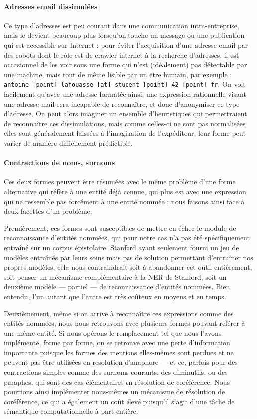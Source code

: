 \documentclass[11pt]{article}
\begin{document}
\paragraph{Adresses email dissimulées}

Ce type d'adresses est peu courant dans une communication intra-entreprise,
mais le devient beaucoup plus lorsqu'on touche un message ou une publication qui
est accessible sur Internet : pour éviter l'acquisition d'une adresse email
par des robots dont le rôle est de crawler internet à la recherche d'adresses,
il est occasionnel de les voir sous une forme qui n'est (idéalement) pas
détectable par une machine, mais tout de même lisible par un être humain, 
par exemple : \texttt{antoine [point] lafouasse [at] student [point] 42 [point]
fr}. On voit facilement qu'avec une adresse formatée ainsi, une expression
rationnelle visant une adresse mail sera incapable de reconnaître, et donc
d'anonymiser ce type d'adresse. On peut alors imaginer un ensemble
d'heuristiques qui permettraient de reconnaître ces dissimulations, mais comme
celles-ci ne sont pas normalisées elles sont généralement laissées à
l'imagination de l'expéditeur, leur forme peut varier de manière difficilement
prédictible.

\paragraph{Contractions de noms, surnoms}

Ces deux formes peuvent être résumées avec le même problème d'une forme
alternative qui réfère à une entité déjà connue, qui plus est avec une
expression qui ne ressemble pas forcément à une entité nommée ; nous faisons
ainsi face à deux facettes d'un problème.

Premièrement, ces formes sont susceptibles de mettre en échec le module de
reconnaissance d'entités nommées, qui pour notre cas n'a pas été spécifiquement
entraîné sur un corpus épistolaire. Stanford ayant seulement fourni un jeu de
modèles entraînés par leurs soins mais pas de solution permettant d'entraîner
nos propres modèles, cela nous contraindrait soit à abandonner cet outil
entièrement, soit penser un mécanisme complémentaire à la NER de Stanford, soit
un deuxième modèle --- partiel --- de reconnaissance d'entités nommées. Bien
entendu, l'un autant que l'autre est très coûteux en moyens et en temps.

Deuxièmement, même si on arrive à reconnaître ces expressions comme des entités
nommées, nous nous retrouvons avec plusieurs formes pouvant référer à une même
entité. Si nous opérons le remplacement tel que nous l'avons implémenté, forme
par forme, on se retrouve avec une perte d'information importante puisque les
formes des mentions elles-mêmes sont perdues et ne peuvent pas être utilisées
en résolution d'anaphore --- et ce, parfois pour des contractions simples comme
des surnoms courants, des diminutifs, ou des paraphes, qui sont des cas
élémentaires en résolution de coréférence. Nous pourrions ainsi implémenter
nous-mêmes un mécanisme de résolution de coréférence, ce qui a également un coût
élevé puisqu'il s'agit d'une tâche de sémantique computationnelle à part
entière.
\end{document}
